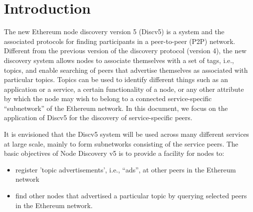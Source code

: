 \section{Introduction}

The new Ethereum node discovery version 5 (Discv5) is a system and the associated protocols for finding participants in a peer-to-peer (P2P) network. Different from the previous version of the discovery protocol (version 4), the new discovery system allows nodes to associate themselves with a set of tags, i.e., topics, and enable searching of peers that advertise themselves as associated with particular topics. Topics can be used to identify different things such as an application or a service, a certain functionality of a node, or any other attribute by which the node may wish to belong to a connected service-specific “subnetwork” of the Ethereum network. In this document, we focus on the application of Discv5 for the discovery of service-specific peers.

It is envisioned that the Discv5 system will be used across many different services at large scale, mainly to form subnetworks consisting of the service peers. The basic objectives of Node Discovery v5 is to provide a facility for nodes to:
\begin{itemize}
    \item register 'topic advertisements', i.e., “ads”, at other peers in the Ethereum network
    \item find other nodes that advertised a particular topic by querying selected peers in the Ethereum network.
\end{itemize}

    
    
